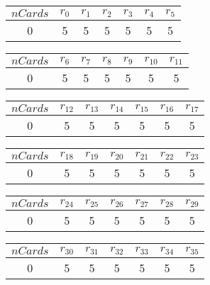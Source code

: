 
\begin{minipage}\begin{tabular}{ | c || c | c | c | c | c | c  | } 
 \hline 
$nCards$  & $r_{0}$ & $r_{1}$ & $r_{2}$ & $r_{3}$ & $r_{4}$ & $r_{5}$ \\ 
 \hline 
0 & 5 & 5 & 5 & 5 & 5 & 5 \\ 
\hline
\end{tabular}
\end{minipage}\hfill


\begin{minipage}\begin{tabular}{ | c || c | c | c | c | c | c  | } 
 \hline 
$nCards$  & $r_{6}$ & $r_{7}$ & $r_{8}$ & $r_{9}$ & $r_{10}$ & $r_{11}$ \\ 
 \hline 
0 & 5 & 5 & 5 & 5 & 5 & 5 \\ 
\hline
\end{tabular}
\end{minipage}


\begin{minipage}\begin{tabular}{ | c || c | c | c | c | c | c  | } 
 \hline 
$nCards$  & $r_{12}$ & $r_{13}$ & $r_{14}$ & $r_{15}$ & $r_{16}$ & $r_{17}$ \\ 
 \hline 
0 & 5 & 5 & 5 & 5 & 5 & 5 \\ 
\hline
\end{tabular}
\end{minipage}


\begin{minipage}\begin{tabular}{ | c || c | c | c | c | c | c  | } 
 \hline 
$nCards$  & $r_{18}$ & $r_{19}$ & $r_{20}$ & $r_{21}$ & $r_{22}$ & $r_{23}$ \\ 
 \hline 
0 & 5 & 5 & 5 & 5 & 5 & 5 \\ 
\hline
\end{tabular}
\end{minipage}


\begin{minipage}\begin{tabular}{ | c || c | c | c | c | c | c  | } 
 \hline 
$nCards$  & $r_{24}$ & $r_{25}$ & $r_{26}$ & $r_{27}$ & $r_{28}$ & $r_{29}$ \\ 
 \hline 
0 & 5 & 5 & 5 & 5 & 5 & 5 \\ 
\hline
\end{tabular}
\end{minipage}


\begin{minipage}\begin{tabular}{ | c || c | c | c | c | c | c  | } 
 \hline 
$nCards$  & $r_{30}$ & $r_{31}$ & $r_{32}$ & $r_{33}$ & $r_{34}$ & $r_{35}$ \\ 
 \hline 
0 & 5 & 5 & 5 & 5 & 5 & 5 \\ 
\hline
\end{tabular}
\end{minipage}


